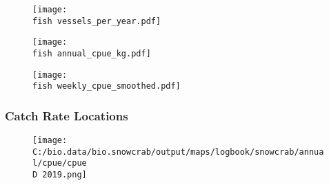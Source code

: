 \documentclass{beamer}
\begin{document}

\begin{frame}
\begin{figure}

 \centerline{\texttt{[image: \\fish vessels\_per\_year.pdf]}}

 \end{figure}
\end{frame}



\begin{frame}
\begin{figure}

 \vspace*{-.25cm}
 \centerline{\texttt{[image: \\fish annual\_cpue\_kg.pdf]}}

 \end{figure}
\end{frame}



\begin{frame}
\begin{figure}

 \vspace*{-.5cm}
 \centerline{\texttt{[image: \\fish weekly\_cpue\_smoothed.pdf]}}

 \end{figure}
\end{frame}


\begin{frame}
\frametitle{Catch Rate Locations}
\begin{figure}
	
	\centerline{\texttt{[image: C:/bio.data/bio.snowcrab/output/maps/logbook/snowcrab/annual/cpue/cpue\\D 2019.png]}}
	
\end{figure}
\end{frame}
\end{document}
